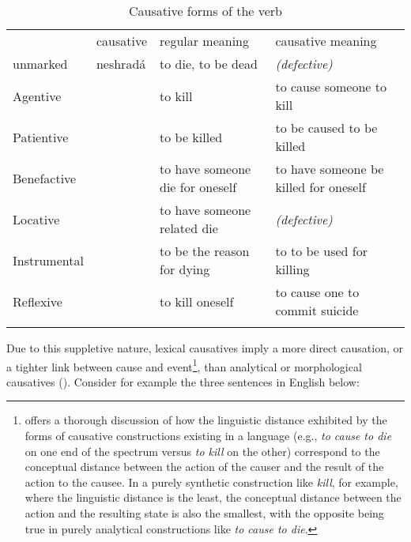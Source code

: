 \begin{table}
\sffamily\footnotesize
\caption{Causative forms of the verb }
	\label{tbl:causative}

    \begin{tabu}to \textwidth{Y[0.5]Y[0.6]YY}
         \toprule\addlinespace
		 										& {\sc causative } &{\sc regular meaning} & {\sc causative meaning}\\\addlinespace
												\midrule\addlinespace
				unmarked				& neshrad\'a									& to die, to be dead 	& \emph{(defective)} \\ \addlinespace
		 		Agentive				& 			& to kill & to cause someone to kill\\ \addlinespace
		 		Patientive			& 					& to be killed & to be caused to be killed\\\addlinespace
				Benefactive			& 				& to have someone die for oneself	& to have someone be killed for oneself\\\addlinespace
				Locative				& 					& to have someone related die&\emph{(defective)}\\\addlinespace
				Instrumental		& &to be the reason for dying&to to be used for killing\\\addlinespace
				Reflexive				& &to kill oneself&to cause one to commit suicide\\
		 		\addlinespace
				\bottomrule

    \end{tabu}

\end{table}

Due to this suppletive nature, lexical causatives imply a more direct causation, or a tighter link between cause and event\footnote{\textcite{haiman1983} offers a thorough discussion of how the linguistic distance exhibited by the forms of causative constructions existing in a language (e.g., \emph{to cause to die} on one end of the spectrum versus \emph{to kill} on the other) correspond to the conceptual distance between the action of the causer and the result of the action to the causee. In a purely synthetic construction like \emph{kill}, for example, where the linguistic distance is the least, the conceptual distance between the action and the resulting state is also the smallest, with the opposite being true in purely analytical constructions like \emph{to cause to die}.}, than analytical or morphological causatives (\cite{velupillai2012, haiman1983}). Consider for example the three sentences in English below:


